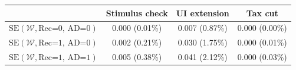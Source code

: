 \begin{tabular}{@{}lccc@{}}
\toprule
                          & Stimulus check      & UI extension    & Tax cut    \\  \midrule
$\mathrm{SE}(\mathcal{W}, \text{Rec=0, AD=0})$ & 0.000 (0.01\%)  & 0.007 (0.87\%)  & 0.000 (0.00\%)     \\
$\mathrm{SE}(\mathcal{W}, \text{Rec=1, AD=0})$ & 0.002 (0.21\%)  & 0.030 (1.75\%)  & 0.000 (0.01\%)     \\
$\mathrm{SE}(\mathcal{W}, \text{Rec=1, AD=1})$ & 0.005 (0.38\%)  & 0.041 (2.12\%)  & 0.000 (0.03\%)     \\ \bottomrule
\end{tabular}
